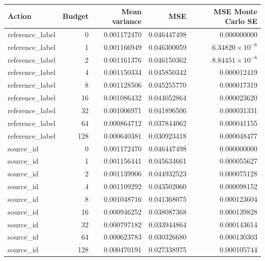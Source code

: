 \begingroup\small
\setlength{\tabcolsep}{4pt}
\begin{longtable}{lrrrr}
\toprule

Action & Budget & Mean variance & MSE & MSE Monte Carlo SE\\\midrule\endhead

reference\_label & 0 & 0.001172470 & 0.046447498 & 0.000000000\\

reference\_label & 1 & 0.001166949 & 0.046300059 & $6.34820\times10^{-6}$\\

reference\_label & 2 & 0.001161376 & 0.046150362 & $8.84451\times10^{-6}$\\

reference\_label & 4 & 0.001150334 & 0.045850342 & 0.000012419\\

reference\_label & 8 & 0.001128506 & 0.045255770 & 0.000017319\\

reference\_label & 16 & 0.001086432 & 0.044052864 & 0.000023620\\

reference\_label & 32 & 0.001006971 & 0.041896506 & 0.000031331\\

reference\_label & 64 & 0.000864712 & 0.037844062 & 0.000041155\\

reference\_label & 128 & 0.000640381 & 0.030923418 & 0.000048477\\

source\_id & 0 & 0.001172470 & 0.046447498 & 0.000000000\\

source\_id & 1 & 0.001156441 & 0.045634661 & 0.000055627\\

source\_id & 2 & 0.001139906 & 0.044932523 & 0.000075128\\

source\_id & 4 & 0.001109292 & 0.043502060 & 0.000098152\\

source\_id & 8 & 0.001048716 & 0.041368075 & 0.000123604\\

source\_id & 16 & 0.000946252 & 0.038087368 & 0.000139828\\

source\_id & 32 & 0.000797182 & 0.033944864 & 0.000143614\\

source\_id & 64 & 0.000623783 & 0.030326680 & 0.000130303\\

source\_id & 128 & 0.000470191 & 0.027338975 & 0.000105744\\

\bottomrule
\end{longtable}
\endgroup

